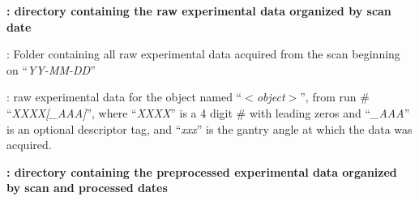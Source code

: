 \documentclass[landscape,12pt]{article}
\begin{document}
\begin{myEnumerate}[labelindent=1pt, leftmargin=*]
\begin{myEnumerate}[labelindent=1pt, leftmargin=*]
\begin{myEnumerate}[labelindent=1pt, leftmargin=*]
\begin{myEnumerate}[labelindent=1pt, leftmargin=*]
\begin{myEnumerate}[labelindent=1pt, leftmargin=*]
\begin{myEnumerate}[labelindent=1pt, leftmargin=*]
\begin{myEnumerate}[labelindent=1pt, leftmargin=*]
                            \end{myEnumerate}
                        \end{myEnumerate}
                    \end{myEnumerate}
                \end{myEnumerate}
            \end{myEnumerate}
        \end{myEnumerate}
    \end{myEnumerate}
\baylorsection
 \color{Black}\textbf{: directory containing the raw experimental data organized by scan date}
\begin{myEnumerate}[labelindent=1pt, leftmargin=*]
    \item {} \color{Black}: Folder containing all raw experimental data acquired from the scan beginning on ``\textit{YY-MM-DD}''
    \begin{myEnumerate}[labelindent=1pt, leftmargin=*]
        \item {} \color{Black}: raw experimental data for the object named ``\textit{$<$object$>$}'', from run \# ``\textit{XXXX[\_AAA]}'', where ``\textit{XXXX}'' is a 4 digit \# with leading zeros and ``\textit{\_AAA}'' is an optional descriptor tag, and ``\textit{xxx}'' is the gantry angle at which the data was acquired.
    \end{myEnumerate}
\end{myEnumerate}
\baylorsection
 \color{Black}\textbf{: directory containing the preprocessed experimental data organized by scan and processed dates}
\end{document}
